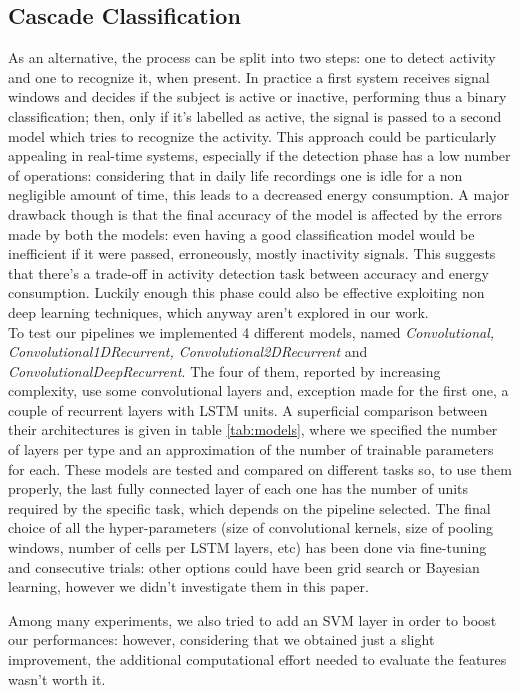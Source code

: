\subsection{Cascade Classification}
\label{sub:twosteps}

As an alternative, the process can be split into two steps: one to detect activity and one to recognize it, when present. In practice a first system receives signal windows and decides if the subject is active or inactive, performing thus a binary classification; then, only if it's labelled as active, the signal is passed to a second model which tries to recognize the activity. This approach could be particularly appealing in real-time systems, especially if the detection phase has a low number of operations: considering that in daily life recordings one is idle for a non negligible amount of time, this leads to a decreased energy consumption. A major drawback though is that the final accuracy of the model is affected by the errors made by both the models: even having a good classification model would be inefficient if it were passed, erroneously, mostly inactivity signals. This suggests that there's a trade-off in activity detection task between accuracy and energy consumption. Luckily enough this phase could also be effective exploiting non deep learning techniques, which anyway aren't explored in our work.\\

To test our pipelines we implemented 4 different models, named \textit{Convolutional, Convolutional1DRecurrent, Convolutional2DRecurrent} and \textit{ConvolutionalDeepRecurrent}. The four of them, reported by increasing complexity, use some convolutional layers and, exception made for the first one, a couple of recurrent layers with LSTM units. A superficial comparison between their architectures is given in table \ref{tab:models}, where we specified the number of layers per type and an approximation of the number of trainable parameters for each. 
These models are tested and compared on different tasks so, to use them properly, the last fully connected layer of each one has the number of units required by the specific task, which depends on the pipeline selected. The final choice of all the hyper-parameters (size of convolutional kernels, size of pooling windows, number of cells per LSTM layers, etc) has been done via fine-tuning and consecutive trials: other options could have been grid search or Bayesian learning, however we didn't investigate them in this paper.

Among many experiments, we also tried to add an SVM layer in order to boost our performances: however, considering that we obtained just a slight improvement, the additional computational effort needed to evaluate the features wasn't worth it. 

